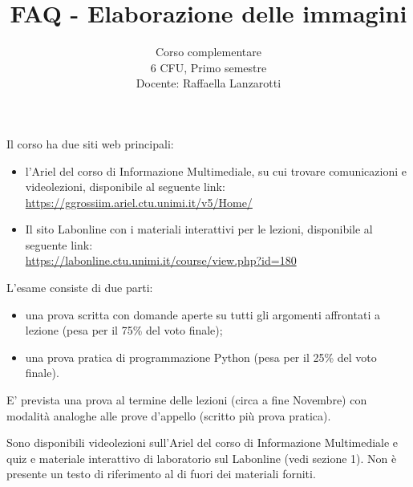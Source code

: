 \documentclass{article}
\title{FAQ - \textbf{Elaborazione delle immagini}}
\author{
	Corso complementare\\6 CFU, Primo semestre\\
	Docente: Raffaella Lanzarotti\\ 
	\date{}
}
\begin{document}
 

\maketitle
	
\begin{QuestionList}
		
     {
    	Il corso ha due siti web principali: 
    	\begin{itemize}
    	\item l'Ariel del corso di Informazione Multimediale, su cui trovare comunicazioni e videolezioni, disponibile
    	al seguente link:\\ \href{https://ggrossiim.ariel.ctu.unimi.it/v5/Home/}{https://ggrossiim.ariel.ctu.unimi.it/v5/Home/}
    	\item Il sito Labonline con i materiali interattivi per le lezioni, disponibile al seguente link:\\
    	\href{https://labonline.ctu.unimi.it/course/view.php?id=180}{https://labonline.ctu.unimi.it/course/view.php?id=180}
        \end{itemize}
	}
		
	 {
		L'esame consiste di due parti:
		\begin{itemize}
		\item una prova scritta con domande aperte su tutti gli argomenti affrontati a lezione (pesa per il 75\% del voto finale);
		\item una prova pratica di programmazione Python (pesa per il 25\% del voto finale).
		\end{itemize}
		E' prevista una prova al termine delle lezioni (circa a fine Novembre) con modalità analoghe alle prove d'appello (scritto più prova pratica).
	}
		

		
	 {
		Sono disponibili videolezioni sull'Ariel del corso di Informazione Multimediale e quiz e materiale interattivo di laboratorio sul Labonline (vedi sezione 1).
		Non è presente un testo di riferimento al di fuori dei materiali forniti.
	}

\newpage


		
	\end{QuestionList}
	
\end{document}
